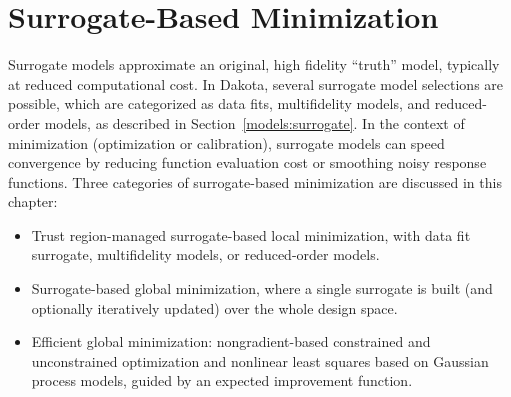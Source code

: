 

\section{Surrogate-Based Minimization}\label{adv_meth:sbm}

Surrogate models approximate an original, high fidelity ``truth''
model, typically at reduced computational cost.  In Dakota, several
surrogate model selections are possible, which are categorized as data
fits, multifidelity models, and reduced-order models, as described in
Section~\ref{models:surrogate}.  In the context of minimization
(optimization or calibration), surrogate models can speed convergence
by reducing function evaluation cost or smoothing noisy response
functions.  Three categories of surrogate-based minimization are
discussed in this chapter:
\begin{itemize}
\item Trust region-managed surrogate-based local minimization, with
  data fit surrogate, multifidelity models, or reduced-order models.

\item Surrogate-based global minimization, where a single surrogate is
  built (and optionally iteratively updated) over the whole design
  space.

\item Efficient global minimization: nongradient-based constrained and
  unconstrained optimization and nonlinear least squares based on
  Gaussian process models, guided by an expected improvement function.
\end{itemize}

